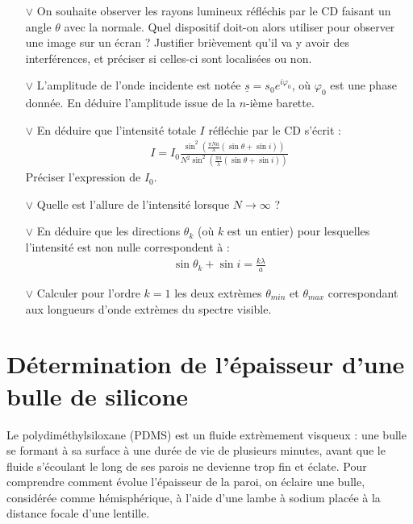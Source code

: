 \documentclass{report}
\begin{document}
\begin{itemize}

	\item[$\vee$] On souhaite observer les rayons lumineux réfléchis par le CD faisant un angle $\theta$ avec la normale. Quel dispositif doit-on alors utiliser pour observer une image sur un écran ? Justifier brièvement qu'il va y avoir des interférences, et préciser si celles-ci sont localisées ou non.
	
	\item[$\vee$] L'amplitude de l'onde incidente est notée $\underline{s}=s_0e^{i\varphi_0}$, où $\varphi_0$ est une phase donnée. En déduire l'amplitude issue de la $n$-ième barette. 
	
	\item[$\vee$] En déduire que l'intensité totale $I$ réfléchie par le CD s'écrit :
	\begin{align*}
		I=I_0\frac{\sin^2\left( \frac{\pi N a}{\lambda}(\sin\theta+\sin i)\right)} {N^2\sin^2\left( \frac{\pi a}{\lambda}(\sin\theta+\sin i)\right) }
	\end{align*}
	Préciser l'expression de $I_0$.
	
	\item[$\vee$] Quelle est l'allure de l'intensité lorsque $N\longrightarrow\infty$ ? 
	
	\item[$\vee$] En déduire que les directions $\theta_k$ (où $k$ est un entier) pour lesquelles l'intensité est non nulle correspondent à :
	\begin{align*}
		\sin\theta_k+\sin i=\frac{k\lambda}{a}
	\end{align*}
	
	\item[$\vee$]  Calculer pour l'ordre $k=1$ les deux extrèmes $\theta_{min}$ et $\theta_{max}$ correspondant aux longueurs d'onde extrèmes du spectre visible.

\end{itemize}

\newpage	

\section*{Détermination de l'épaisseur d'une bulle de silicone}

Le polydiméthylsiloxane (PDMS) est un fluide extrèmement visqueux : une bulle se formant à sa surface à une durée de vie de plusieurs minutes, avant que le fluide s'écoulant le long de ses parois ne devienne trop fin et éclate. Pour comprendre comment évolue l'épaisseur de la paroi, on éclaire une bulle, considérée comme hémisphérique, à l'aide d'une lambe à sodium placée à la distance focale d'une lentille.
\end{document}
